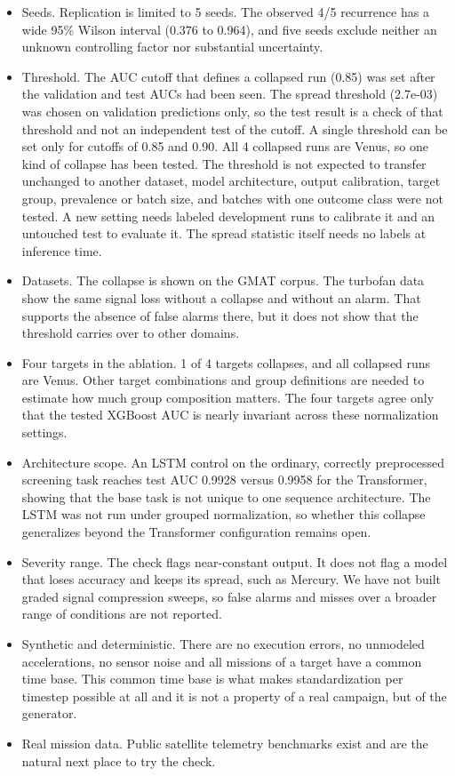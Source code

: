 \documentclass{IEEEtaes}
\begin{document}
\begin{itemize}
\item Seeds. Replication is limited to 5 seeds. The observed 4/5 recurrence has a wide 95\% Wilson interval (0.376 to 0.964), and five seeds exclude neither an unknown controlling factor nor substantial uncertainty.
\item Threshold. The AUC cutoff that defines a collapsed run (0.85) was set after the validation and test AUCs had been seen. The spread threshold (2.7e-03) was chosen on validation predictions only, so the test result is a check of that threshold and not an independent test of the cutoff. A single threshold can be set only for cutoffs of 0.85 and 0.90. All 4 collapsed runs are Venus, so one kind of collapse has been tested. The threshold is not expected to transfer unchanged to another dataset, model architecture, output calibration, target group, prevalence or batch size, and batches with one outcome class were not tested. A new setting needs labeled development runs to calibrate it and an untouched test to evaluate it. The spread statistic itself needs no labels at inference time.
\item Datasets. The collapse is shown on the GMAT corpus. The turbofan data show the same signal loss without a collapse and without an alarm. That supports the absence of false alarms there, but it does not show that the threshold carries over to other domains.
\item Four targets in the ablation. 1 of 4 targets collapses, and all collapsed runs are Venus. Other target combinations and group definitions are needed to estimate how much group composition matters. The four targets agree only that the tested XGBoost AUC is nearly invariant across these normalization settings.
\item Architecture scope. An LSTM control on the ordinary, correctly preprocessed screening task reaches test AUC 0.9928 versus 0.9958 for the Transformer, showing that the base task is not unique to one sequence architecture. The LSTM was not run under grouped normalization, so whether this collapse generalizes beyond the Transformer configuration remains open.
\item Severity range. The check flags near-constant output. It does not flag a model that loses accuracy and keeps its spread, such as Mercury. We have not built graded signal compression sweeps, so false alarms and misses over a broader range of conditions are not reported.
\item Synthetic and deterministic. There are no execution errors, no unmodeled accelerations, no sensor noise and all missions of a target have a common time base. This common time base is what makes standardization per timestep possible at all and it is not a property of a real campaign, but of the generator.
\item Real mission data. Public satellite telemetry benchmarks exist \cite{kotowski2024,hundman2018} and are the natural next place to try the check.
\end{itemize}
\end{document}
